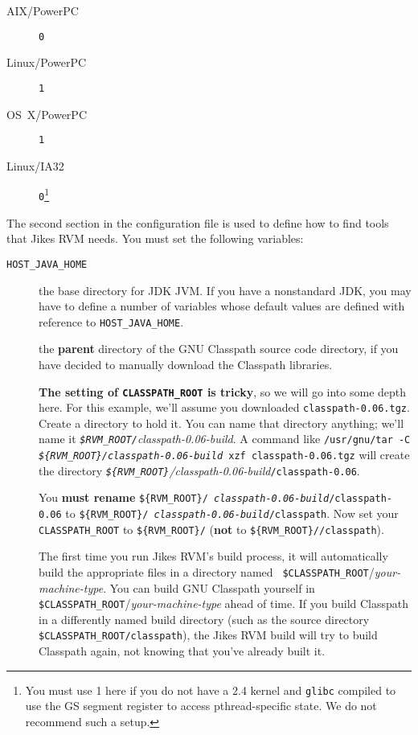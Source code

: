 \begin{enumerate}
\begin{description}
\item[AIX/PowerPC] \texttt{0 }
\item[Linux/PowerPC] \texttt{1}
\item[OS~X/PowerPC] \texttt{1}
\item[Linux/IA32] \texttt{0}\footnote{You must use 1 here if you do not
have a 2.4 kernel and \texttt{glibc} compiled to use the GS segment register to
access pthread-specific state.  We do not recommend such a setup.}
\end{description}                

The second section in the configuration file is used to define how to
find tools that Jikes RVM needs. You must set the following variables:

\begin{description}

\item[\texttt{HOST\_JAVA\_HOME}] the base directory for JDK JVM.  If you
have a nonstandard JDK, you may have to define a number of variables
whose default values are defined with reference to \texttt{HOST\_JAVA\_HOME}.

\label{manual-classpath-root}%
\item[] the {\bf parent} directory of the GNU
  Classpath source code directory, if you have decided to manually
  download the Classpath libraries. 

{\bf The setting of \texttt{CLASSPATH\_ROOT} is tricky}, so we will go
into some depth here.  For this example, we'll assume you downloaded
\texttt{classpath-0.06.tgz}.  Create a directory to hold it.  You can
name that directory anything; we'll name it 
{\it \texttt{\$RVM\_ROOT/}classpath-0.06-build}.  
A command like 
\texttt{/usr/gnu/tar -C
  {\rm \it \texttt{\$\{RVM\_ROOT\}/}\-classpath-0.06-build} xzf classpath-0.06.tgz} 
will create the directory
 {\rm \it \texttt{\$\{RVM\_ROOT\}}/\-classpath-0.06-build}\texttt{/\-classpath-0.06}.  

You {\bf must rename} \texttt{\$\{RVM\_ROOT\}/{\it
    class\-path-0.06-build}/\-class\-path-0.06} to \texttt{\$\{RVM\_\-ROOT\}/{\it
    class\-path-0.06-build}/\-class\-path}.  Now set your {\tt
  CLASS\-PATH\_ROOT} to \texttt{\$\{RVM\_\-ROOT\}/}
({\bf not} to \texttt{\$\{RVM\_\-ROOT\}//\-class\-path}).


The first time you run Jikes RVM's build process, it will
automatically build the appropriate files in a directory named {\tt
\$CLASSPATH\_ROOT}/{\it your-machine-type}.   You can build GNU Classpath
yourself in  \texttt{\$CLASSPATH\_ROOT}/{\it your-machine-type} ahead of
time.  If you build Classpath in a differently named build directory 
(such as the source directory \texttt{\$CLASSPATH\_ROOT/classpath}), the
Jikes RVM build will try to build Classpath again, not knowing that
you've already built it.


\end{description}
\end{enumerate}
